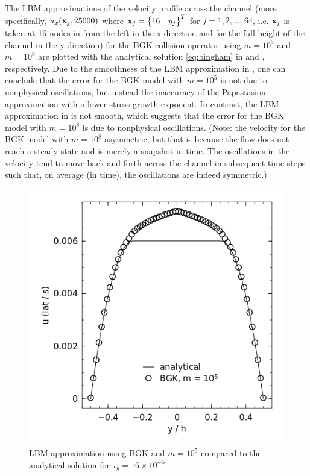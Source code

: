 The LBM approximations of the velocity profile across the channel (more specifically, $u_x(\mathbf{x}_j, 25000)$ where $\mathbf{x}_j = \begin{Bmatrix}16 & y_j\end{Bmatrix}^T$ for $j = 1, 2, ..., 64$, i.e. $\mathbf{x}_j$ is taken at 16 nodes in from the left in the x-direction and for the full height of the channel in the y-direction) for the BGK collision operator using $m = 10^5$ and $m = 10^8$ are plotted with the analytical solution \eqref{eq:bingham} in  and , respectively.
Due to the smoothness of the LBM approximation in , one can conclude that the error for the BGK model with $m = 10^5$ is not due to nonphysical oscillations, but instead the inaccuracy of the Papastasiou approximation with a lower stress growth exponent.
In contrast, the LBM approximation in  is not smooth, which suggests that the error for the BGK model with $m = 10^8$ is due to nonphysical oscillations. (Note: the velocity for the BGK model with $m = 10^8$ \DIFdelbegin {}\DIFdelend \DIFaddbegin {}\DIFaddend asymmetric, but that is because the flow does not reach a steady-state and  is merely a snapshot in time.
The oscillations in the velocity tend to move back and forth across the channel in subsequent time steps such that, on average (in time), the oscillations are indeed symmetric.)

\begin{figure}
\centering
\includegraphics[width=\linewidth]{figs/poise-bingham/bgk-5/analytical-vs-approx.png}
\caption{LBM approximation using BGK and $m = 10^5$ compared to the analytical solution for $\tau_y = 16 \times 10^{-5}$.}
\label{fig:bing-analyt-bgk-5}
\end{figure}

